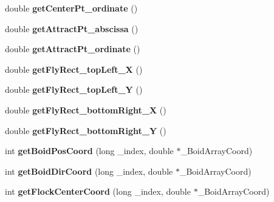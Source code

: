 \begin{DoxyCompactItemize}
\item 
\hypertarget{class_boids_manager_a1c1796132d554ccfabdc1a9612698b5a}{double {\bfseries get\-Center\-Pt\-\_\-ordinate} ()}\label{class_boids_manager_a1c1796132d554ccfabdc1a9612698b5a}

\item 
\hypertarget{class_boids_manager_a0f44b74576ba7aab0d5d177abd0491e3}{double {\bfseries get\-Attract\-Pt\-\_\-abscissa} ()}\label{class_boids_manager_a0f44b74576ba7aab0d5d177abd0491e3}

\item 
\hypertarget{class_boids_manager_a3384b5c8edbb164669e351fdb565a30a}{double {\bfseries get\-Attract\-Pt\-\_\-ordinate} ()}\label{class_boids_manager_a3384b5c8edbb164669e351fdb565a30a}

\item 
\hypertarget{class_boids_manager_a31717ff3332cb4e02cde858070fd10c5}{double {\bfseries get\-Fly\-Rect\-\_\-top\-Left\-\_\-\-X} ()}\label{class_boids_manager_a31717ff3332cb4e02cde858070fd10c5}

\item 
\hypertarget{class_boids_manager_a937c9615bf34dd6163657ff205234e79}{double {\bfseries get\-Fly\-Rect\-\_\-top\-Left\-\_\-\-Y} ()}\label{class_boids_manager_a937c9615bf34dd6163657ff205234e79}

\item 
\hypertarget{class_boids_manager_a6bb1f4841d71638d36dabc14a0aaf784}{double {\bfseries get\-Fly\-Rect\-\_\-bottom\-Right\-\_\-\-X} ()}\label{class_boids_manager_a6bb1f4841d71638d36dabc14a0aaf784}

\item 
\hypertarget{class_boids_manager_aca2eb448fb6ce18884cc214ac6c0d69a}{double {\bfseries get\-Fly\-Rect\-\_\-bottom\-Right\-\_\-\-Y} ()}\label{class_boids_manager_aca2eb448fb6ce18884cc214ac6c0d69a}

\item 
\hypertarget{class_boids_manager_a89ff3776c07af6a185186795d0a65896}{int {\bfseries get\-Boid\-Pos\-Coord} (long \-\_\-index, double $\ast$\-\_\-\-Boid\-Array\-Coord)}\label{class_boids_manager_a89ff3776c07af6a185186795d0a65896}

\item 
\hypertarget{class_boids_manager_abd45250cc8f23e0048b932f14bde9e0a}{int {\bfseries get\-Boid\-Dir\-Coord} (long \-\_\-index, double $\ast$\-\_\-\-Boid\-Array\-Coord)}\label{class_boids_manager_abd45250cc8f23e0048b932f14bde9e0a}

\item 
\hypertarget{class_boids_manager_a557013b58237d6b3fb1e1f704487f80e}{int {\bfseries get\-Flock\-Center\-Coord} (long \-\_\-index, double $\ast$\-\_\-\-Boid\-Array\-Coord)}\label{class_boids_manager_a557013b58237d6b3fb1e1f704487f80e}

\end{DoxyCompactItemize}


